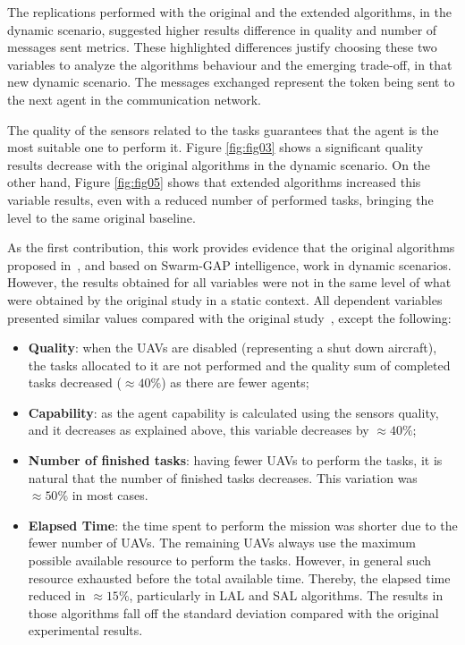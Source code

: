The replications performed with the original and the extended algorithms, in the dynamic scenario, suggested higher results difference in quality and number of messages sent metrics. These highlighted differences justify choosing these two variables to analyze the algorithms behaviour and the emerging trade-off, in that new dynamic scenario. The messages exchanged represent the token being sent to the next agent in the communication network.

The quality of the sensors related to the tasks guarantees that the agent is the most suitable one to perform it. Figure \ref{fig:fig03} shows a significant quality results decrease with the original algorithms in the dynamic scenario. On the other hand, Figure \ref{fig:fig05} shows that extended algorithms increased this variable results, even with a reduced number of performed tasks, bringing the level to the same original baseline. 

As the first contribution, this work provides evidence that the original algorithms proposed in~\citep{MAS07}, and based on Swarm-GAP intelligence, work in dynamic scenarios. However, the results obtained for all variables were not in the same level of what were obtained by the original study in a static context. All dependent variables presented similar values compared with the original study~\citep{MAS07}, except the following:

\begin{itemize}
   \item \textbf{Quality}: when the UAVs are disabled (representing a shut down aircraft), the tasks allocated to it are not performed and the quality sum of completed tasks decreased ($\approx 40\%$) as there are fewer agents;
   \item \textbf{Capability}: as the agent capability is calculated using the sensors quality,  and it decreases as explained above, this variable decreases by $\approx 40\%$;
   \item \textbf{Number of finished tasks}: having fewer UAVs to perform the tasks, it is natural that the number of finished tasks decreases. This variation was $\approx 50\%$ in most cases.
   \item \textbf{Elapsed Time}: the time spent to perform the mission was shorter due to the fewer number of UAVs. The remaining UAVs always use the maximum possible available resource to perform the tasks. However, in general such resource exhausted before the total available time. Thereby, the elapsed time reduced in $\approx 15\%$, particularly in LAL and SAL algorithms. The results in those algorithms fall off the standard deviation compared with the original experimental results.
\end{itemize}

